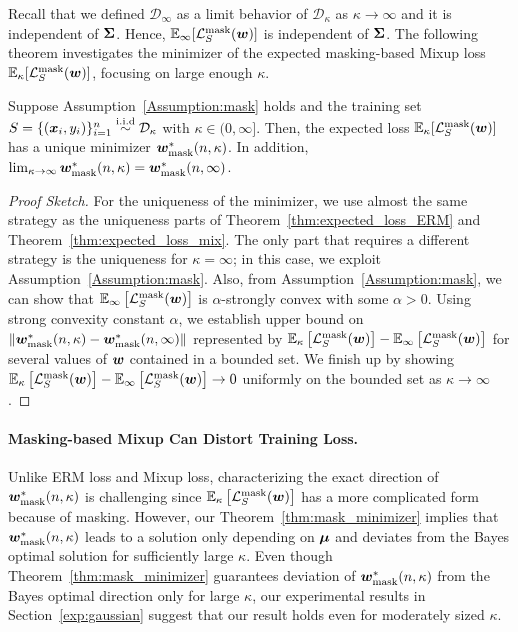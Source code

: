 Recall that we defined $\mathcal{D}_\infty$ as a limit behavior of $\mathcal{D}_\kappa$ as $\kappa \rightarrow \infty$ and it is independent of $\mSigma$. Hence, $\mathbb{E}_\infty [\lossmask(\vw)]$ is independent of $\mSigma$. The following theorem investigates the minimizer of the expected masking-based Mixup loss $\mathbb{E}_\kappa [\lossmask (\vw)]$, focusing on large enough $\kappa$.

\begin{theorem}\label{thm:mask_minimizer}
Suppose Assumption~\ref{Assumption:mask} holds and the training set $S = \{(\vx_i, y_i)\}_{i=1}^n\overset{\mathrm{i.i.d}}{\sim} \mathcal{D}_\kappa$ with $\kappa \in (0, \infty]$. Then, the expected loss $\mathbb{E}_\kappa [\lossmask(\vw)]$ has a unique minimizer $\wmask$. In addition, $\lim_{\kappa \rightarrow \infty} \wmask[\kappa] = \wmask[\infty]$.
\end{theorem}
\vspace*{-10pt}
\begin{proof}[Proof Sketch]
For the uniqueness of the minimizer, we use almost the same strategy as the uniqueness parts of Theorem~\ref{thm:expected_loss_ERM} and Theorem~\ref{thm:expected_loss_mix}. The only part that requires a different strategy is the uniqueness for $\kappa = \infty$; in this case, we exploit Assumption~\ref{Assumption:mask}. Also, from Assumption~\ref{Assumption:mask}, we can show that $\mathbb{E}_\infty \left[ \lossmask (\vw) \right]$ is $\alpha$-strongly convex with some $\alpha>0$.
Using strong convexity constant $\alpha$, we establish upper bound on $\lVert \wmask - \wmask[\infty] \rVert$ represented by $\mathbb{E}_\kappa \left[ \lossmask (\vw) \right]  - \mathbb{E}_\infty \left[ \lossmask (\vw) \right]$ for several values of $\vw$ contained in a bounded set.
We finish up by showing $\mathbb{E}_\kappa \left[ \lossmask (\vw) \right]  - \mathbb{E}_\infty \left[ \lossmask (\vw) \right] \rightarrow 0$ uniformly on the bounded set as $\kappa \rightarrow \infty$.
\vspace{-5pt}
\end{proof} 
\paragraph{Masking-based Mixup Can Distort Training Loss.}
Unlike ERM loss and Mixup loss, characterizing the exact direction of $\wmask$ is challenging since $\mathbb{E}_\kappa \left[ \lossmask (\vw) \right]$ has a more complicated form because of masking. However,
our Theorem~\ref{thm:mask_minimizer} implies that $\wmask$ leads to a solution only depending on $\vmu$ and deviates from the Bayes optimal solution for sufficiently large $\kappa$. Even though Theorem~\ref{thm:mask_minimizer} guarantees deviation of $\wmask$ from the Bayes optimal direction only for large $\kappa$, our experimental results in Section~\ref{exp:gaussian} suggest that our result holds even for moderately sized $\kappa$.

